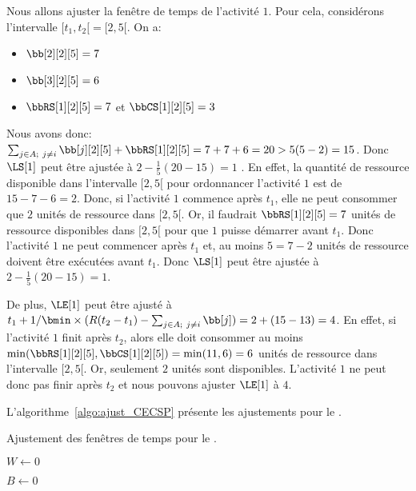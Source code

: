 \begin{ex}
  Nous allons ajuster la fenêtre de temps de l'activité $1$. Pour cela,
  considérons l'intervalle $[t_1,t_2[=[2,5[$. On a:
  \begin{itemize}
  \item $\bb[2][2][5]=7$
  \item $\bb[3][2][5]=6$
  \item $\bbRS[1][2][5]=7$ et $\bbCS[1][2][5]=3$
  \end{itemize}
  Nous avons donc: $\sum_{j\in A;\ j\neq i} \bb[j][2][5] +
  \bbRS[1][2][5]= 7+7+6 =20 > 5 (5-2) =15$. Donc $\LS[1]$ peut être
  ajustée 
  à $ 2 -\frac{1}{5} (20-15) = 1$ .
  En effet, la quantité de ressource disponible dans l'intervalle
  $[2,5[$ pour ordonnancer l'activité $1$ est de $15-7-6=2$. Donc, si
  l'activité $1$ commence après $t_1$, elle ne peut consommer que $2$
  unités de ressource dans $[2,5[$.  Or, il faudrait $\bbRS[1][2][5]= 7$
  unités de ressource disponibles dans $[2,5[$ pour que $1$ puisse
  démarrer avant $t_1$. Donc l'activité $1$ ne peut commencer après $t_1$
  et, au moins $5= 7-2$ unités de ressource doivent être exécutées avant
  $t_1$. Donc $\LS[1]$ peut être ajustée à $2 - \frac{1}{5}(20-15) =1 $.

  De plus, $\LE[1]$ peut être ajusté à $t_1 + 1/ \bmin \times (R(t_2-t_1) -
  \sum_{j\in A;\ j\neq i} \bb[j] )= 2+(15-13)=4$. En effet, si l'activité
  $1$ finit après $t_2$, alors elle doit consommer au moins
  $\min(\bbRS[1][2][5],\bbCS[1][2][5])=\min(11,6)=6$ unités de ressource
  dans l'intervalle $[2,5[$. Or, seulement $2$ unités sont
  disponibles. L'activité $1$ ne peut donc pas finir après $t_2$ et nous
  pouvons ajuster $\LE[1]$ à $4$.
\end{ex}

L'algorithme~\ref{algo:ajust_CECSP} présente les ajustements pour le
\CECSP. 
\begin{algorithm}[!htb]
  \caption{Ajustement des fenêtres de temps pour le \CECSP.}
  \label{algo:ajust_CECSP}
    \PourTous {intervalles d'intérêt $[t_1,t_2[$}
    { $W\gets 0$
    
      $B\gets 0$
}    
\end{algorithm}


